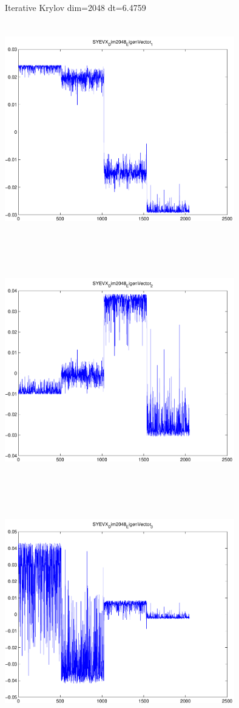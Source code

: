 \documentclass[9pt]{article}
\theoremstyle{plain}
\theoremstyle{definition}
\theoremstyle{remark}
\numberwithin{equation}{section}
\begin{document}
Iterative Krylov dim=2048 dt=6.4759
\includegraphics[width=10.0cm,height=10.0cm]{SYEVX_Dim2048_EigenVector_1.pdf}

\includegraphics[width=10.0cm,height=10.0cm]{SYEVX_Dim2048_EigenVector_2.pdf}

\includegraphics[width=10.0cm,height=10.0cm]{SYEVX_Dim2048_EigenVector_3.pdf}
\end{document}
